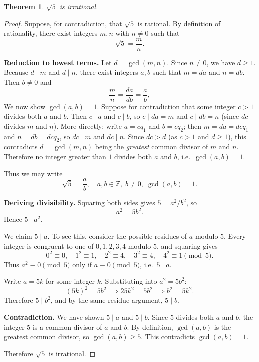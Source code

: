 \newtheorem{theorem}{Theorem}

\begin{theorem}
$\sqrt{5}$ is irrational.
\end{theorem}

\begin{proof}
Suppose, for contradiction, that $\sqrt{5}$ is rational. By definition of rationality, there exist integers $m, n$ with $n \neq 0$ such that
\[
\sqrt{5} = \frac{m}{n}.
\]

\textbf{Reduction to lowest terms.}
Let $d = \gcd(m, n)$. Since $n \neq 0$, we have $d \geq 1$. Because $d \mid m$ and $d \mid n$, there exist integers $a, b$ such that $m = da$ and $n = db$. Then $b \neq 0$ and
\[
\frac{m}{n} = \frac{da}{db} = \frac{a}{b},
\]
We now show $\gcd(a, b) = 1$. Suppose for contradiction that some integer $c > 1$ divides both $a$ and $b$. Then $c \mid a$ and $c \mid b$, so $c \mid da = m$ and $c \mid db = n$ (since $dc$ divides $m$ and $n$). More directly: write $a = cq_1$ and $b = cq_2$; then $m = da = dcq_1$ and $n = db = dcq_2$, so $dc \mid m$ and $dc \mid n$. Since $dc > d$ (as $c > 1$ and $d \geq 1$), this contradicts $d = \gcd(m, n)$ being the \emph{greatest} common divisor of $m$ and $n$. Therefore no integer greater than $1$ divides both $a$ and $b$, i.e.\ $\gcd(a, b) = 1$.

Thus we may write
\[
\sqrt{5} = \frac{a}{b}, \quad a, b \in \mathbb{Z},\; b \neq 0,\; \gcd(a, b) = 1.
\]

\textbf{Deriving divisibility.}
Squaring both sides gives $5 = a^2 / b^2$, so
\[
a^2 = 5b^2.
\]
Hence $5 \mid a^2$.

We claim $5 \mid a$. To see this, consider the possible residues of $a$ modulo $5$. Every integer is congruent to one of $0, 1, 2, 3, 4$ modulo $5$, and squaring gives
\[
0^2 \equiv 0, \quad 1^2 \equiv 1, \quad 2^2 \equiv 4, \quad 3^2 \equiv 4, \quad 4^2 \equiv 1 \pmod{5}.
\]
Thus $a^2 \equiv 0 \pmod{5}$ only if $a \equiv 0 \pmod{5}$, i.e.\ $5 \mid a$.

Write $a = 5k$ for some integer $k$. Substituting into $a^2 = 5b^2$:
\[
(5k)^2 = 5b^2 \implies 25k^2 = 5b^2 \implies b^2 = 5k^2.
\]
Therefore $5 \mid b^2$, and by the same residue argument, $5 \mid b$.

\textbf{Contradiction.}
We have shown $5 \mid a$ and $5 \mid b$. Since $5$ divides both $a$ and $b$, the integer $5$ is a common divisor of $a$ and $b$. By definition, $\gcd(a,b)$ is the greatest common divisor, so $\gcd(a,b) \geq 5$. This contradicts $\gcd(a, b) = 1$.

Therefore $\sqrt{5}$ is irrational.
\end{proof}
